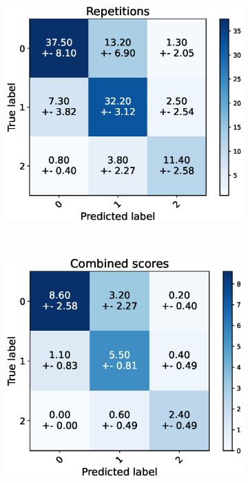 \begin{figure}
  \centering
  \begin{subfigure}[t]{0.48\textwidth}
      \includegraphics[width=\textwidth]{files/figs/res/trunk/cnf-reps.eps}
      \caption{}
      \label{fig:trunk-cnf-reps}
  \end{subfigure}
  ~
  \begin{subfigure}[t]{0.48\textwidth}
      \includegraphics[width=\textwidth]{files/figs/res/trunk/cnf-combined.eps}
      \caption{}
      \label{fig:trunk-cnf-comb}
  \end{subfigure}


\end{figure}
